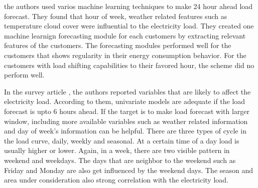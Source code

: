 \cite{parra2013initial} the authors used varios machine learning techniques to make 24 hour ahead load forecast. They found that hour of week, weather related features such as temperature cloud cover were influential to the electricity load. They created one machine learnign forecasting module for each customers by extracting relevant features of the customers. The forecasting modules performed well for the customers that shows regularity in their energy consumption behavior. For the customers with load shifting capabilities to their favored hour, the scheme did no perform well.

In the survey article \cite{hahn2009electric}, the authors reported variables that are likely to affect the electricity load. According to them, univariate models are adequate if the load forecast is upto 6 hours ahead. If the target is to make load forecast with larger window, including more available variables such as weather related information and day of week's information can be helpful. There are three types of cycle in the load curve, daily, weekly and seasonal. At a certain time of a day load is usually higher or lower. Again, in a week, there are two visible pattern in weekend and weekdays. The days that are neighbor to the weekend such as Friday and Monday are also get influenced by the weekend days. The season and area under consideration also strong correlation with the electricity load.
